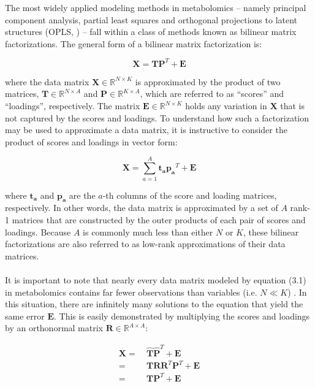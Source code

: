 \begin{doublespace}
The most widely applied modeling methods in metabolomics -- namely principal
component analysis, partial least squares and orthogonal projections to latent
structures (OPLS, \cite{trygg:jchemo2002}) -- fall within a class of methods
known as bilinear matrix factorizations. The general form of a bilinear matrix
factorization is:

\begin{equation}
\mathbf{X} = \mathbf{T} \mathbf{P}^T + \mathbf{E}
\end{equation}

where the data matrix $\mathbf{X} \in \mathbb{R}^{N \times K}$ is approximated
by the product of two matrices, $\mathbf{T} \in \mathbb{R}^{N \times A}$ and
$\mathbf{P} \in \mathbb{R}^{K \times A}$, which are referred to as ``scores''
and ``loadings'', respectively. The matrix
$\mathbf{E} \in \mathbb{R}^{N \times K}$ holds any variation in $\mathbf{X}$
that is not captured by the scores and loadings. To understand how such a
factorization may be used to approximate a data matrix, it is instructive to
consider the product of scores and loadings in vector form:

\begin{equation}
\mathbf{X} = \sum_{a=1}^A \mathbf{t_a} \mathbf{p_a}^T + \mathbf{E}
\end{equation}

where $\mathbf{t_a}$ and $\mathbf{p_a}$ are the $a$-th columns of the score
and loading matrices, respectively. In other words, the data matrix is
approximated by a set of $A$ rank-1 matrices that are constructed by the
outer products of each pair of scores and loadings. Because $A$ is commonly
much less than either $N$ or $K$, these bilinear factorizations are also
referred to as low-rank approximations of their data matrices.
\\\\
It is important to note that nearly every data matrix modeled by equation (3.1)
in metabolomics contains far fewer observations than variables
(i.e. $N \ll K$) \cite{worley:cmb2013}. In this situation, there are infinitely
many solutions to the equation that yield the same error $\mathbf{E}$. This is
easily demonstrated by multiplying the scores and loadings by an orthonormal
matrix $\mathbf{R} \in \mathbb{R}^{A \times A}$:

\begin{align}
\mathbf{X}
 =& \: \hat{\mathbf{T}} \hat{\mathbf{P}}^T + \mathbf{E}
\nonumber \\
 =& \: \mathbf{T} \mathbf{R} \mathbf{R}^T \mathbf{P}^T + \mathbf{E}
\nonumber \\
 =& \: \mathbf{T} \mathbf{P}^T + \mathbf{E}
\end{align}


\end{doublespace}

